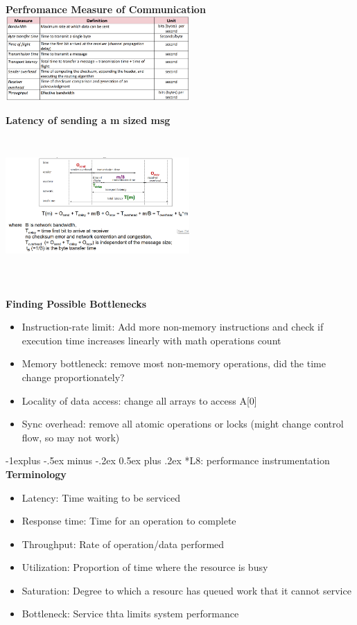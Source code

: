 \documentclass[10pt, landscape]{article}
\makeatletter
\renewcommand{\subsection}{\@startsection{subsection}{2}{0mm}%
                                {-1explus -.5ex minus -.2ex}%
                                {0.5ex plus .2ex}%
                                {\normalfont\normalsize\bfseries}}
\makeatother
\begin{document}
\begin{multicols}{4}
\textbf{Perfromance Measure of Communication}
\includegraphics*[width=7cm]{communication.png}


\textbf{Latency of sending a m sized msg}
\includegraphics*[width=7cm, height=6cm]{latency.png}

\textbf{Finding Possible Bottlenecks}
\begin{itemize}
    \item Instruction-rate limit: Add more non-memory instructions and check if execution time increases linearly with math operations count 
    \item Memory bottleneck: remove most non-memory operations, did the time change proportionately?
    \item Locality of data access: change all arrays to access A[0]
    \item Sync overhead: remove all atomic operations or locks (might change control flow, so may not work)
\end{itemize}

\subsection*{L8: performance instrumentation}
\textbf{Terminology}
\begin{itemize}
    \item Latency: Time waiting to be serviced 
    \item Response time: Time for an operation to complete
    \item Throughput: Rate of operation/data performed 
    \item Utilization: Proportion of time where the resource is busy
    \item Saturation: Degree to which a resourc has queued work that it cannot service 
    \item Bottleneck: Service thta limits system performance 
\end{itemize}


\end{multicols}
\end{document}
